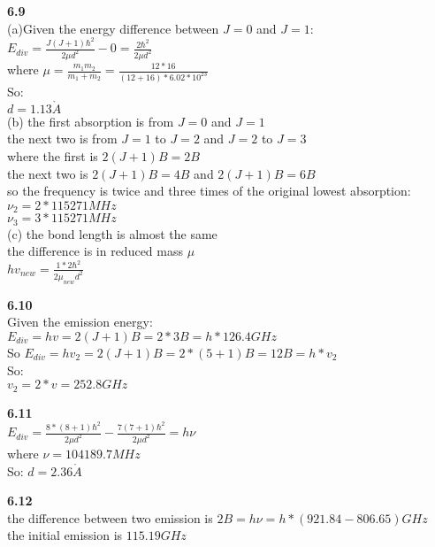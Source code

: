 \documentclass{article}
\begin{document}
\textbf{6.9}\\
(a)Given the energy difference between $J = 0$ and $J = 1$:\\
$E_{div} = \frac{J(J+1)\hbar^2}{2\mu d^2} - 0= \frac{2\hbar^2}{2\mu d^2}$\\
where $\mu = \frac{m_1m_2}{m_1+m_2} = \frac{12*16}{(12+16)*6.02*10^{23}}$\\
So:\\
$d = 1.13\mathring{A}$\\
(b) the first absorption is from $J = 0$ and $J = 1$\\
the next two is from $J = 1$ to $J = 2$ and $J = 2$ to $J = 3$\\
where the first is $2(J+1)B = 2B$\\
the next two is $2(J+1)B = 4B$ and $2(J+1)B = 6B$\\
so the frequency is twice and three times of the original lowest absorption:\\
$\nu_2 = 2*115271MHz$\\
$\nu_3 = 3*115271MHz$\\
(c) the bond length is almost the same\\
the difference is in reduced mass $\mu$\\
$hv_{new} = \frac{1*2\hbar^2}{2\mu_{new}d^2}$\\
\newline

\textbf{6.10}\\
Given the emission energy:\\
$E_{div} = hv = 2(J+1)B = 2*3B = h*126.4GHz$\\
So $E_{div} = hv_2 = 2(J+1)B = 2*(5+1)B = 12B = h*v_2$\\
So:\\
$v_2 = 2*v = 252.8GHz$\\
\newline

\textbf{6.11}\\
$E_{div} = \frac{8*(8+1)\hbar^2}{2\mu d^2} - \frac{7(7+1)\hbar^2}{2\mu d^2} = h\nu$\\
where $\nu = 104189.7MHz$\\
So: $d = 2.36\mathring{A}$\\
\newline

\textbf{6.12}\\
the difference between two emission is $2B = h\nu = h * (921.84 - 806.65)GHz$\\
the initial emission is $115.19GHz$\\
\newline
\end{document}
